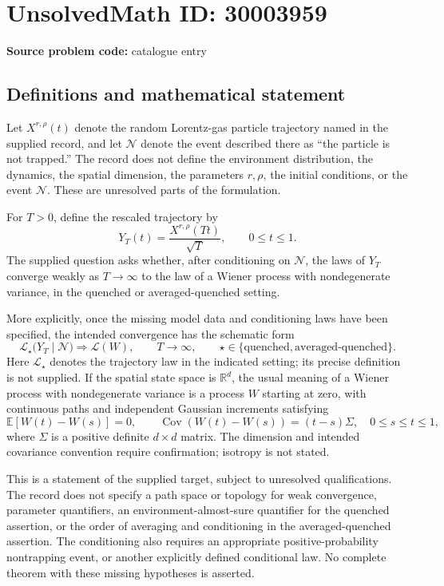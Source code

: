 \documentclass[11pt]{article}
\newcommand{\R}{\mathbb{R}}
\begin{document}
\section*{UnsolvedMath ID: 30003959}
\textbf{Source problem code:} catalogue entry
\subsection{Definitions and mathematical statement}
Let \(X^{r,\rho}(t)\) denote the random Lorentz-gas particle trajectory named in the supplied record, and let \(\mathcal N\) denote the event described there as ``the particle is not trapped.'' The record does not define the environment distribution, the dynamics, the spatial dimension, the parameters \(r,\rho\), the initial conditions, or the event \(\mathcal N\). These are unresolved parts of the formulation.

For \(T>0\), define the rescaled trajectory by
\[
Y_T(t)=\frac{X^{r,\rho}(Tt)}{\sqrt T},\qquad 0\leq t\leq 1.
\]
The supplied question asks whether, after conditioning on \(\mathcal N\), the laws of \(Y_T\) converge weakly as \(T\to\infty\) to the law of a Wiener process with nondegenerate variance, in the quenched or averaged-quenched setting.

More explicitly, once the missing model data and conditioning laws have been specified, the intended convergence has the schematic form
\[
\mathcal L_{\star}\bigl(Y_T\mid\mathcal N\bigr)
\Longrightarrow \mathcal L(W),
\qquad T\to\infty,
\qquad
\star\in\{\text{quenched},\text{averaged-quenched}\}.
\]
Here \(\mathcal L_{\star}\) denotes the trajectory law in the indicated setting; its precise definition is not supplied. If the spatial state space is \(\R^d\), the usual meaning of a Wiener process with nondegenerate variance is a process \(W\) starting at zero, with continuous paths and independent Gaussian increments satisfying
\[
\mathbb E[W(t)-W(s)]=0,\qquad
\operatorname{Cov}(W(t)-W(s))=(t-s)\Sigma,
\quad 0\leq s\leq t\leq1,
\]
where \(\Sigma\) is a positive definite \(d\times d\) matrix. The dimension and intended covariance convention require confirmation; isotropy is not stated.

This is a statement of the supplied target, subject to unresolved qualifications. The record does not specify a path space or topology for weak convergence, parameter quantifiers, an environment-almost-sure quantifier for the quenched assertion, or the order of averaging and conditioning in the averaged-quenched assertion. The conditioning also requires an appropriate positive-probability nontrapping event, or another explicitly defined conditional law. No complete theorem with these missing hypotheses is asserted.
\end{document}
